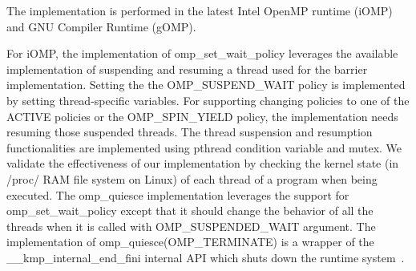 The implementation is performed in the latest Intel OpenMP runtime (iOMP) and GNU Compiler Runtime (gOMP). %

For iOMP, the implementation of {\sf omp\_set\_wait\_policy} leverages the available 
implementation of suspending and resuming a thread used for the barrier implementation. Setting the 
the {\sf OMP\_SUSPEND\_WAIT} policy is implemented by setting thread-specific variables. For
supporting changing policies to one of the {\sf ACTIVE} policies or the {\sf OMP\_SPIN\_YIELD} policy, 
the implementation needs resuming those suspended threads. %
The thread suspension and resumption functionalities are implemented using pthread condition variable and mutex.  
We validate the effectiveness of our implementation by checking the kernel state (in /proc/ RAM file system on Linux) 
of each thread of a program when being executed. 
The {\sf omp\_quiesce} implementation leverages the support for {\sf omp\_set\_wait\_policy} except that it 
should change the behavior of all the threads when it is called with {\sf OMP\_SUSPENDED\_WAIT} argument. 
The implementation of {\sf omp\_quiesce(OMP\_TERMINATE)} is a wrapper of 
the {\sf \_\_kmp\_internal\_end\_fini} internal API which shuts down the runtime system~\cite{iccmanual}. 



